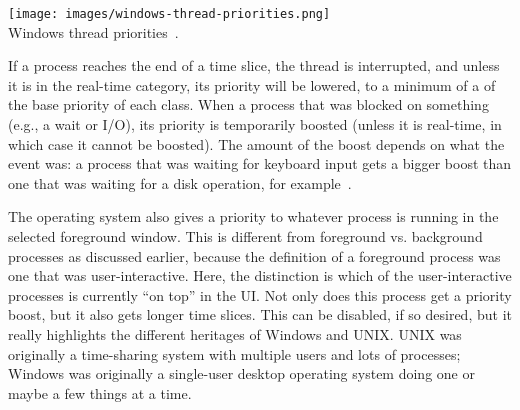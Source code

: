 \begin{center}
	\texttt{[image: images/windows-thread-priorities.png]}\\
	Windows thread priorities~\cite{osc}.
\end{center}

If a process reaches the end of a time slice, the thread is interrupted, and unless it is in the real-time category, its priority will be lowered, to a minimum of a of the base priority of each class. When a process that was blocked on something (e.g., a wait or I/O), its priority is temporarily boosted (unless it is real-time, in which case it cannot be boosted). The amount of the boost depends on what the event was: a process that was waiting for keyboard input gets a bigger boost than one that was waiting for a disk operation, for example~\cite{osc}. 

The operating system also gives a priority to whatever process is running in the selected foreground window. This is different from foreground vs. background processes as discussed earlier, because the definition of a foreground process was one that was user-interactive. Here, the distinction is which of the user-interactive processes is currently ``on top'' in the UI. Not only does this process get a priority boost, but it also gets longer time slices. This can be disabled, if so desired, but it really highlights the different heritages of Windows and UNIX. UNIX was originally a time-sharing system with multiple users and lots of processes; Windows was originally a single-user desktop operating system doing one or maybe a few things at a time.




